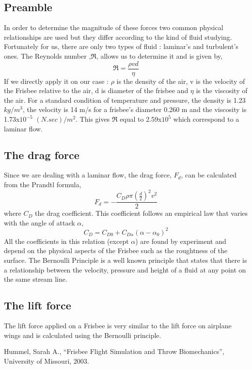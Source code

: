 \documentclass[10pt,a4paper]{report}
\begin{document}
\subsection{Preamble}
In order to determine the magnitude of these forces two common physical relationships are used but they differ according to the kind of fluid studying. Fortunately for us, there are only two types of fluid : laminar's and turbulent's ones. The Reynolds number ,$\Re$, allows us to determine it and is given by,
\[\Re = \frac{\rho v d}{\eta}\]
If we directly apply it on our case : $\rho$ is the density of the air, v is the velocity of the Frisbee relative to the air, d is diameter of the frisbee and $\eta$ is the viscosity of the air. For a standard condition of temperature and pressure, the density is 1.23 $kg/m^3$, the velocity is 14 m/s for a frisbee's diameter 0.260 m and the viscosity is 1.73x$10^{-5}$ $(N.sec)/m^2$. This gives $\Re$ equal to 2.59x$10^5$ which correspond to a laminar flow.

\subsection{The drag force}

Since we are dealing with a laminar flow, the drag force, $F_d$, can be calculated from the Prandtl formula,
\[F_d = - \frac{C_D \rho \pi \left(\frac{d}{2}\right)^2 v^2}{2}\]
where $C_D$ the drag coefficient. This coefficient follows an empirical law\cite{art1} that varies with the angle of attack $\alpha$,
\[C_D = C_{D0} + C_{D\alpha}(\alpha-\alpha_0)^2\]
All the coefficients in this relation (except $\alpha$) are found by experiment and depend on the physical aspects of the Frisbee such as the roughtness of the surface.
The Bernoulli Principle is a well known principle that states that there is a relationship between the velocity, pressure and height of a fluid at any point on the same stream line.

\subsection{The lift force}

The lift force applied on a Frisbee is very similar to the lift force on
airplane wings and is calculated using the Bernoulli principle.

\begin{thebibliography}{9}

  Hummel, Sarah A.,
  “Frisbee Flight Simulation and Throw Biomechanics”,
  University of Missouri,
  2003.

\end{thebibliography}
\end{document}
